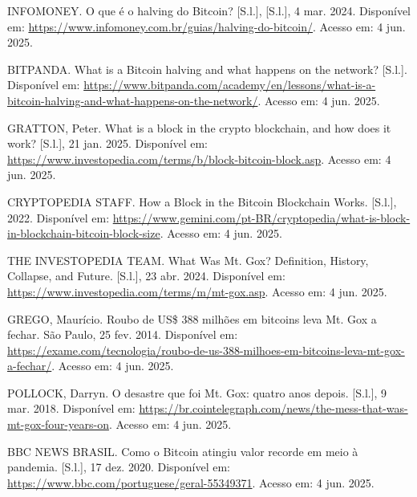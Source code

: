 \begin{thebibliography}{99}
     INFOMONEY. O que é o halving do Bitcoin? [S.l.], [S.l.], 4 mar. 2024. Disponível em: 
    \href{https://www.infomoney.com.br/guias/halving-do-bitcoin/}{https://www.infomoney.com.br/guias/halving-do-bitcoin/}. 
    Acesso em: 4 jun. 2025.
    
     BITPANDA. What is a Bitcoin halving and what happens on the network? [S.l.]. Disponível em: 
    \href{https://www.bitpanda.com/academy/en/lessons/what-is-a-bitcoin-halving-and-what-happens-on-the-network/}{https://www.bitpanda.com/academy/en/lessons/what-is-a-bitcoin-halving-and-what-happens-on-the-network/}. 
    Acesso em: 4 jun. 2025.
    
     GRATTON, Peter. What is a block in the crypto blockchain, and how does it work? [S.l.], 21 jan. 2025. Disponível em: 
    \href{https://www.investopedia.com/terms/b/block-bitcoin-block.asp}{https://www.investopedia.com/terms/b/block-bitcoin-block.asp}. 
    Acesso em: 4 jun. 2025.
    
     CRYPTOPEDIA STAFF. How a Block in the Bitcoin Blockchain Works. [S.l.], 2022. Disponível em: 
    \href{https://www.gemini.com/pt-BR/cryptopedia/what-is-block-in-blockchain-bitcoin-block-size}{https://www.gemini.com/pt-BR/cryptopedia/what-is-block-in-blockchain-bitcoin-block-size}.  
    Acesso em: 4 jun. 2025.
    
     THE INVESTOPEDIA TEAM. What Was Mt. Gox? Definition, History, Collapse, and Future. [S.l.], 23 abr. 2024. Disponível em: 
    \href{https://www.investopedia.com/terms/m/mt-gox.asp}{https://www.investopedia.com/terms/m/mt-gox.asp}. 
    Acesso em: 4 jun. 2025.
    
     GREGO, Maurício. Roubo de US\$ 388 milhões em bitcoins leva Mt. Gox a fechar. São Paulo, 25 fev. 2014. Disponível em: 
    \href{https://exame.com/tecnologia/roubo-de-us-388-milhoes-em-bitcoins-leva-mt-gox-a-fechar/}{https://exame.com/tecnologia/roubo-de-us-388-milhoes-em-bitcoins-leva-mt-gox-a-fechar/}.
    Acesso em: 4 jun. 2025.
    
     POLLOCK, Darryn. O desastre que foi Mt. Gox: quatro anos depois. [S.l.], 9 mar. 2018. Disponível em: 
    \href{https://br.cointelegraph.com/news/the-mess-that-was-mt-gox-four-years-on}{https://br.cointelegraph.com/news/the-mess-that-was-mt-gox-four-years-on}. 
    Acesso em: 4 jun. 2025.
    
     BBC NEWS BRASIL. Como o Bitcoin atingiu valor recorde em meio à pandemia. [S.l.], 17 dez. 2020. Disponível em: 
    \href{https://www.bbc.com/portuguese/geral-55349371}{https://www.bbc.com/portuguese/geral-55349371}. 
    Acesso em: 4 jun. 2025.
    

\end{thebibliography}
